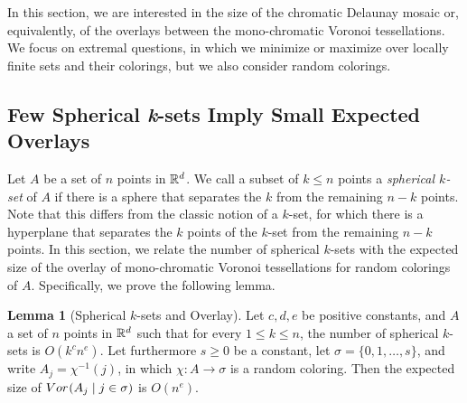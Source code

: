 \documentclass[a4paper]{article}
\newcommand {\mm}[1]   {\ifmmode{#1}\else{\mbox{\(#1\)}}\fi}
\newcommand{\Rspace}        {\mm{{\mathbb R}}}
\newcommand{\Overlay}[3]    {\mm{{\rm Vor}_{#1}{({#2}\mid{#3})}}}
\theoremstyle{definition}
\numberwithin{theorem}{section}
\newtheorem{lemma}[theorem]{Lemma}
\numberwithin{equation}{section}
\begin{document}
In this section, we are interested in the size of the chromatic Delaunay mosaic or, equivalently, 
of the overlays between the mono-chromatic Voronoi tessellations.
We focus on extremal questions, in which we minimize or maximize over locally finite sets and their colorings, but we also consider random colorings.

\subsection{Few Spherical {\it k}-sets Imply Small Expected Overlays}
\label{sec:4.1}

Let $A$ be a set of $n$ points in $\Rspace^d$.
We call a subset of $k \leq n$ points a \emph{spherical $k$-set} of $A$ if there is a sphere that separates the $k$ from the remaining $n-k$ points.
Note that this differs from the classic notion of a $k$-set, for which there is a hyperplane that separates the $k$ points of the $k$-set from the remaining $n-k$ points.
In this section, we relate the number of spherical $k$-sets with the expected size of the overlay of mono-chromatic Voronoi tessellations for random colorings of $A$.
Specifically, we prove the following lemma.
\begin{lemma}[Spherical $k$-sets and Overlay]
  \label{lem:spherical_k-set_and_overlay}
  Let $c, d, e$ be positive constants, and $A$ a set of $n$ points in $\Rspace^d$ such that for every $1 \leq k \leq n$, the number of spherical $k$-sets is $O(k^c n^e)$.
  Let furthermore $s \geq 0$ be a constant, let $\sigma = \{0,1,\ldots,s\}$, and write $A_j = \chi^{-1} (j)$, in which $\chi \colon A \to \sigma$ is a random coloring.
  Then the expected size of $\Overlay{}{A_j}{j \in \sigma}$ is $O(n^e)$.
\end{lemma}
\end{document}
